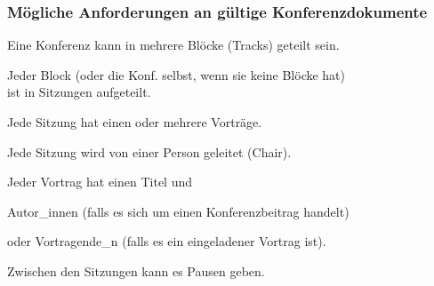     \begin{frame}
      \frametitle{Mögliche Anforderungen an gültige Konferenzdokumente}
      
      \begin{Itemize}
        \item
          Eine Konferenz kann in mehrere Blöcke (Tracks) geteilt sein.
        \item
          Jeder Block (oder die Konf. selbst, wenn sie keine Blöcke hat)\\
          ist in Sitzungen aufgeteilt.
        \item
          Jede Sitzung hat einen oder mehrere Vorträge.
        \item
          Jede Sitzung wird von einer Person geleitet (Chair).
        \item
          Jeder Vortrag hat einen Titel und
          \begin{Itemize}
            \item
              Autor\_innen (falls es sich um einen Konferenzbeitrag handelt)
            \item
              oder Vortragende\_n (falls es ein eingeladener Vortrag ist).
          \end{Itemize}
        \item
          Zwischen den Sitzungen kann es Pausen geben.
      \end{Itemize}


    \end{frame}

